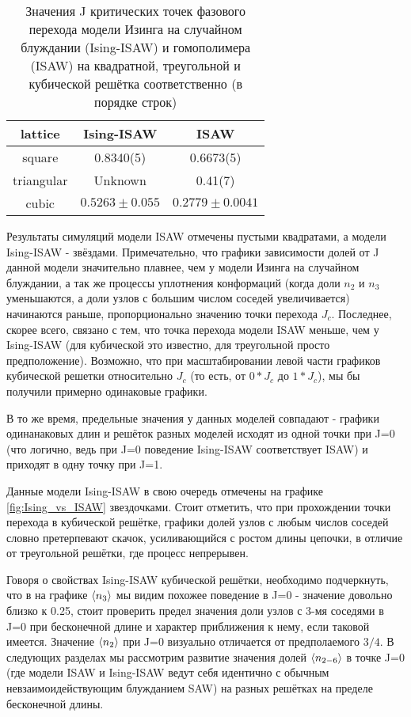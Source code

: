 \begin{table}[h!]
    \centering
    \begin{tabular}{|c|c|c|}
        \hline
        lattice & Ising-ISAW & ISAW \\ \hline
        square & 0.8340(5)\cite{faizullina2021critical} &  0.6673(5)\cite{caracciolo2011geometrical} \\ \hline
        triangular & Unknown & 0.41(7) \cite{Privman1986}\\ \hline
        cubic & $0.5263 \pm 0.055$\cite{foster2021critical} & $0.2779 \pm 0.0041$\cite{Tesi1996} \\ \hline
    \end{tabular}
    \caption{Значения J критических точек фазового перехода модели Изинга на случайном блуждании (Ising-ISAW) и гомополимера (ISAW) на квадратной, треугольной и кубической решётка соответственно (в порядке строк)}
    \label{tab:crits}
\end{table}

Результаты симуляций модели ISAW отмечены пустыми квадратами, а модели Ising-ISAW - звёздами. Примечательно, что графики зависимости долей от J данной модели значительно плавнее, чем у модели Изинга на случайном блуждании, а так же процессы уплотнения конформаций (когда доли $n_{2}$ и $n_{3}$ уменьшаются, а доли узлов с большим числом соседей увеличивается) начинаются раньше, пропорционально значению точки перехода $J_{c}$. Последнее, скорее всего, связано с тем, что точка перехода модели ISAW меньше, чем у Ising-ISAW (для кубической это известно, для треугольной просто предположение). Возможно, что при масштабировании левой части графиков кубической решетки относительно $J_{c}$ (то есть, от $0*J_{c}$ до $1*J_{c}$), мы бы получили примерно одинаковые графики.

В то же время, предельные значения у данных моделей совпадают - графики одинанаковых длин и решёток разных моделей исходят из одной точки при J=0 (что логично, ведь при J=0 поведение Ising-ISAW соответствует ISAW) и приходят в одну точку при J=1.

Данные модели Ising-ISAW в свою очередь отмечены на графике \ref{fig:Ising_vs_ISAW} звездочками. Стоит отметить, что при прохождении точки перехода в кубической решётке, графики долей узлов с любым числов соседей словно претерпевают скачок, усиливающийся с ростом длины цепочки, в отличие от треугольной решётки, где процесс непрерывен.

Говоря о свойствах Ising-ISAW кубической решётки, необходимо подчеркнуть, что в на графике $\langle n_{3} \rangle$ мы видим похожее поведение в J=0 - значение довольно близко к 0.25, стоит проверить предел значения доли узлов с 3-мя соседями в J=0 при бесконечной длине и характер приближения к нему, если таковой имеется. Значение $\langle n_{2} \rangle$ при J=0 визуально отличается от предполаемого $3/4$. В следующих разделах мы рассмотрим развитие значения долей $\langle n_{2-6} \rangle$ в точке J=0 (где модели ISAW и Ising-ISAW ведут себя идентично с обычным невзаимоидействующим блужданием SAW) на разных решётках на пределе бесконечной длины.


